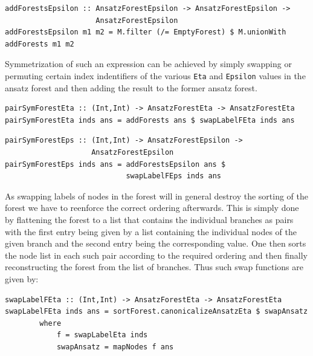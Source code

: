 \documentclass[a4paper,12pt, DIV=14, BCOR=5mm, twoside, headsepline]{scrbook}
\begin{document}
\begin{samepage}
\begin{verbatim}
addForestsEpsilon :: AnsatzForestEpsilon -> AnsatzForestEpsilon ->
                     AnsatzForestEpsilon
addForestsEpsilon m1 m2 = M.filter (/= EmptyForest) $ M.unionWith
addForests m1 m2
\end{verbatim} 
\end{samepage}
Symmetrization of such an expression can be achieved by simply swapping or permuting certain index indentifiers of the various \texttt{Eta} and \texttt{Epsilon} values in the ansatz forest and then adding the result to the former ansatz forest.
\begin{samepage} 
\begin{verbatim}
pairSymForestEta :: (Int,Int) -> AnsatzForestEta -> AnsatzForestEta
pairSymForestEta inds ans = addForests ans $ swapLabelFEta inds ans
\end{verbatim} 
\end{samepage}

\begin{samepage}
\begin{verbatim}
pairSymForestEps :: (Int,Int) -> AnsatzForestEpsilon ->
                    AnsatzForestEpsilon
pairSymForestEps inds ans = addForestsEpsilon ans $ 
                            swapLabelFEps inds ans
\end{verbatim} 
\end{samepage}

As swapping labels of nodes in the forest will in general destroy the sorting of the forest we have to reenforce the correct ordering afterwards. This is simply done by flattening the forest to a list that contains the individual branches as pairs with the first entry being given by a list containing the individual nodes of the given branch and the second entry being the corresponding value. One then sorts the node list in each such pair according to the required ordering and then finally reconstructing the forest from the list of branches. Thus such swap functions are given by:

\begin{samepage} 
\begin{verbatim}
swapLabelFEta :: (Int,Int) -> AnsatzForestEta -> AnsatzForestEta
swapLabelFEta inds ans = sortForest.canonicalizeAnsatzEta $ swapAnsatz
        where
            f = swapLabelEta inds
            swapAnsatz = mapNodes f ans
\end{verbatim} 
\end{samepage}
\end{document}
